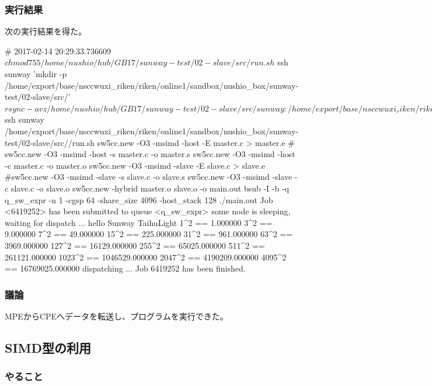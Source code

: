 \subsubsection{実行結果}

次の実行結果を得た。

\begin{code}
# 2017-02-14 20:29:33.736609
$ chmod 755 /home/nushio/hub/GB17/sunway-test/02-slave/src/run.sh
$ ssh sunway 'mkdir -p /home/export/base/nsccwuxi_riken/riken/online1/sandbox/nushio_box/sunway-test/02-slave/src/'
$ rsync -avz /home/nushio/hub/GB17/sunway-test/02-slave/src/ sunway:/home/export/base/nsccwuxi_riken/riken/online1/sandbox/nushio_box/sunway-test/02-slave/src/
sending incremental file list
./
Makefile
master.c
run.sh
slave.c

sent 1,298 bytes  received 98 bytes  146.95 bytes/sec
total size is 1,995  speedup is 1.43
$ ssh sunway /home/export/base/nsccwuxi_riken/riken/online1/sandbox/nushio_box/sunway-test/02-slave/src//run.sh
sw5cc.new -O3 -msimd -host -E master.c > master.e
#	sw5cc.new -O3 -msimd -host -s master.c -o master.s
sw5cc.new -O3 -msimd -host -c master.c -o master.o
sw5cc.new -O3 -msimd -slave -E slave.c > slave.e
#sw5cc.new -O3 -msimd -slave -s slave.c -o slave.s
sw5cc.new -O3 -msimd -slave -c slave.c -o slave.o
sw5cc.new -hybrid  master.o slave.o -o main.out
bsub -I -b -q q_sw_expr -n 1 -cgsp 64 -share_size 4096 -host_stack 128 ./main.out
Job <6419252> has been submitted to queue <q_sw_expr>
some node is sleeping, waiting for dispatch ...
hello Sunway TaihuLight
1^2 == 1.000000
3^2 == 9.000000
7^2 == 49.000000
15^2 == 225.000000
31^2 == 961.000000
63^2 == 3969.000000
127^2 == 16129.000000
255^2 == 65025.000000
511^2 == 261121.000000
1023^2 == 1046529.000000
2047^2 == 4190209.000000
4095^2 == 16769025.000000
dispatching ...
Job 6419252 has been finished.

\end{code}

\subsubsection{議論}

MPEからCPEへデータを転送し、プログラムを実行できた。


\subsection{SIMD型の利用}
\subsubsection{やること}

